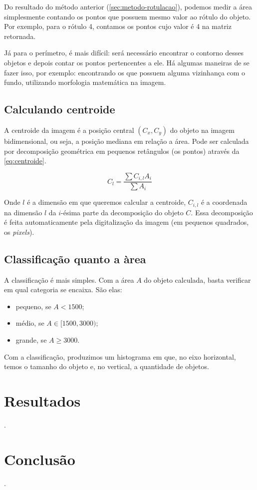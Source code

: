 \documentclass[brazilian,a4paper,twocolumn]{article}
\begin{document}
        Do resultado do método anterior (\ref{sec:metodo-rotulacao}), podemos medir a área simplesmente contando os pontos que possuem mesmo valor ao rótulo do objeto. Por exemplo, para o rótulo 4, contamos os pontos cujo valor é 4 na matriz retornada.

        Já para o perímetro, é mais difícil: será necessário encontrar o contorno desses objetos e depois contar os pontos pertencentes a ele. Há algumas maneiras de se fazer isso, por exemplo: encontrando os que possuem alguma vizinhança com o fundo, utilizando morfologia matemática na imagem.

    \subsection{Calculando centroide}

        A centroide da imagem é a posição central $ (C_x, C_y) $ do objeto na imagem bidimensional, ou seja, a posição mediana em relação a área. Pode ser calculada por decomposição geométrica em pequenos retângulos (os pontos) através da \cref{eq:centroide}.

        \begin{equation}
            \label{eq:centroide}
            C_l = \frac{\sum C_{i,l} A_i}{\sum A_i}
        \end{equation}

        Onde $l$ é a dimensão em que queremos calcular a centroide, $C_{i,l}$ é a coordenada na dimensão $l$ da $i$-ésima parte da decomposição do objeto $C$. Essa decomposição é feita automaticamente pela digitalização da imagem (em pequenos quadrados, os \textit{pixels}).

    \subsection{Classificação quanto a àrea}

        A classificação é mais simples. Com a área $A$ do objeto calculada, basta verificar em qual categoria se encaixa. São elas:
        \begin{itemize}
            \item pequeno, se $A < 1500$;
            \item médio, se $A \in [1500, 3000)$;
            \item grande, se $A \geq 3000$.
        \end{itemize}

        Com a classificação, produzimos um histograma em que, no eixo horizontal, temos o tamanho do objeto e, no vertical, a quantidade de objetos.

\section{Resultados}

    .


\section{Conclusão}

    .
\end{document}
